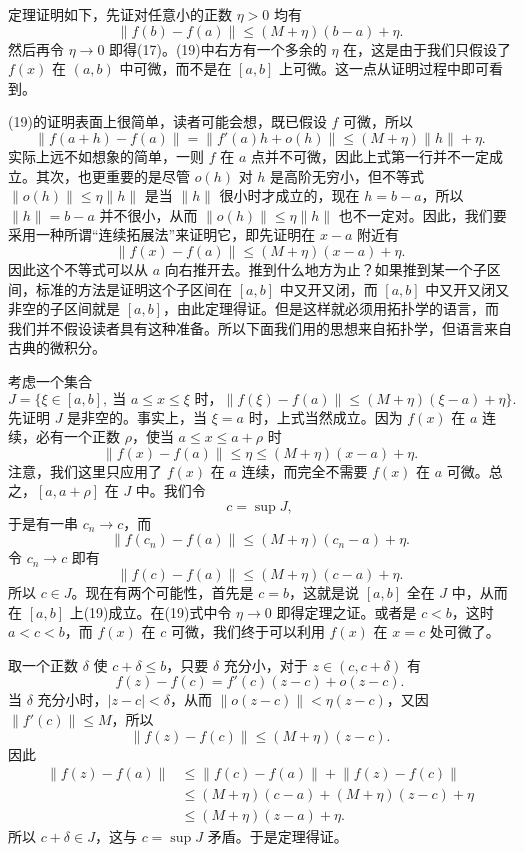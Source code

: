 定理证明如下，先证对任意小的正数 $\eta>0$ 均有
\begin{equation}
 \lVert f(b)-f(a)\rVert\le(M+\eta)(b-a)+\eta.
 \tag{19}
\end{equation}
然后再令 $\eta\to0$ 即得(17)。(19)中右方有一个多余的 $\eta$ 在，这是由于我们只假设了 $f(x)$ 在 $(a,b)$ 中可微，而不是在 $[a,b]$ 上可微。这一点从证明过程中即可看到。

(19)的证明表面上很简单，读者可能会想，既已假设 $f$ 可微，所以
\[
 \lVert f(a+h)-f(a)\rVert=\lVert f'(a)h+o(h)\rVert
 \le(M+\eta)\lVert h\rVert+\eta.
\]
实际上远不如想象的简单，一则 $f$ 在 $a$ 点并不可微，因此上式第一行并不一定成立。其次，也更重要的是尽管 $o(h)$ 对 $h$ 是高阶无穷小，但不等式 $\lVert o(h)\rVert\le\eta\lVert h\rVert$ 是当 $\lVert h\rVert$ 很小时才成立的，现在 $h=b-a$，所以 $\lVert h\rVert=b-a$ 并不很小，从而 $\lVert o(h)\rVert\le\eta\lVert h\rVert$ 也不一定对。因此，我们要采用一种所谓“连续拓展法”来证明它，即先证明在 $x-a$ 附近有
\[
 \lVert f(x)-f(a)\rVert\le(M+\eta)(x-a)+\eta.
\]
因此这个不等式可以从 $a$ 向右推开去。推到什么地方为止？如果推到某一个子区间，标准的方法是证明这个子区间在 $[a,b]$ 中又开又闭，而 $[a,b]$ 中又开又闭又非空的子区间就是 $[a,b]$，由此定理得证。但是这样就必须用拓扑学的语言，而我们并不假设读者具有这种准备。所以下面我们用的思想来自拓扑学，但语言来自古典的微积分。

考虑一个集合
\[
 J=\{\xi\in[a,b],\ \text{当 }a\le x\le\xi\text{ 时，}
 \lVert f(\xi)-f(a)\rVert\le(M+\eta)(\xi-a)+\eta\}.
\]
先证明 $J$ 是非空的。事实上，当 $\xi=a$ 时，上式当然成立。因为 $f(x)$ 在 $a$ 连续，必有一个正数 $\rho$，使当 $a\le x\le a+\rho$ 时
\[
 \lVert f(x)-f(a)\rVert\le\eta\le(M+\eta)(x-a)+\eta.
\]
注意，我们这里只应用了 $f(x)$ 在 $a$ 连续，而完全不需要 $f(x)$ 在 $a$ 可微。总之，$[a,a+\rho]$ 在 $J$ 中。我们令
\[
 c=\sup J,
\]
于是有一串 $c_n\to c$，而
\[
 \lVert f(c_n)-f(a)\rVert\le(M+\eta)(c_n-a)+\eta.
\]
令 $c_n\to c$ 即有
\[
 \lVert f(c)-f(a)\rVert\le(M+\eta)(c-a)+\eta.
\]
所以 $c\in J$。现在有两个可能性，首先是 $c=b$，这就是说 $[a,b]$ 全在 $J$ 中，从而在 $[a,b]$ 上(19)成立。在(19)式中令 $\eta\to0$ 即得定理之证。或者是 $c<b$，这时 $a<c<b$，而 $f(x)$ 在 $c$ 可微，我们终于可以利用 $f(x)$ 在 $x=c$ 处可微了。

取一个正数 $\delta$ 使 $c+\delta\le b$，只要 $\delta$ 充分小，对于 $z\in(c,c+\delta)$ 有
\[
 f(z)-f(c)=f'(c)(z-c)+o(z-c).
\]
当 $\delta$ 充分小时，$|z-c|<\delta$，从而 $\lVert o(z-c)\rVert<\eta(z-c)$，又因 $\lVert f'(c)\rVert\le M$，所以
\[
 \lVert f(z)-f(c)\rVert\le(M+\eta)(z-c).
\]
因此
\begin{align*}
 \lVert f(z)-f(a)\rVert
 &\le\lVert f(c)-f(a)\rVert+\lVert f(z)-f(c)\rVert\\
 &\le(M+\eta)(c-a)+(M+\eta)(z-c)+\eta\\
 &\le(M+\eta)(z-a)+\eta.
\end{align*}
所以 $c+\delta\in J$，这与 $c=\sup J$ 矛盾。于是定理得证。

